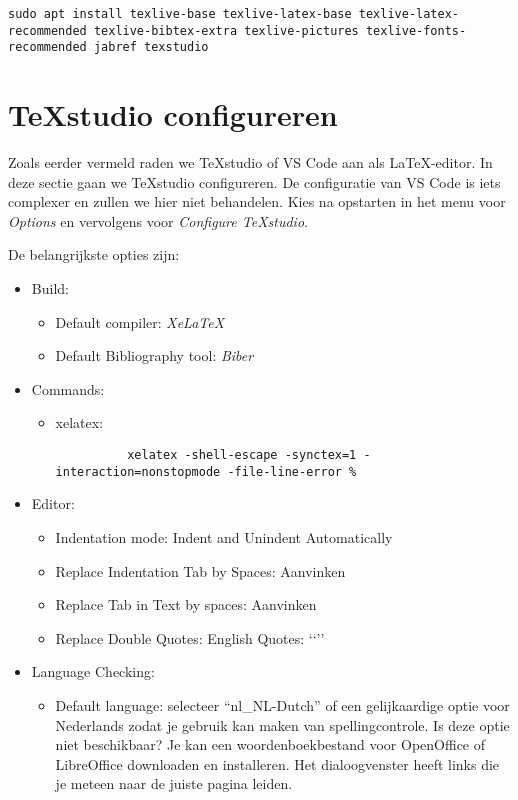 \begin{verbatim}
sudo apt install texlive-base texlive-latex-base texlive-latex-recommended texlive-bibtex-extra texlive-pictures texlive-fonts-recommended jabref texstudio
\end{verbatim}


\section{{\TeX}studio configureren}%
\label{sec:texstudio-configureren}

Zoals eerder vermeld raden we {\TeX}studio of VS Code aan als {\LaTeX}-editor. In deze sectie gaan we {\TeX}studio configureren. De configuratie van VS Code is iets complexer en zullen we hier niet behandelen. Kies na opstarten in het menu voor \textit{Options} en vervolgens voor \textit{Configure {\TeX}studio}.

De belangrijkste opties zijn:

\begin{itemize}
  \item Build:
    \begin{itemize}
      \item Default compiler: \textit{XeLaTeX}
      \item Default Bibliography tool: \textit{Biber}
    \end{itemize}
  \item Commands:
    \begin{itemize}
      \item xelatex:
      
        \begin{verbatim}
          xelatex -shell-escape -synctex=1 -interaction=nonstopmode -file-line-error %
        \end{verbatim}

    \end{itemize}
  \item Editor:
    \begin{itemize}
      \item Indentation mode: Indent and Unindent Automatically
      \item Replace Indentation Tab by Spaces: Aanvinken
      \item Replace Tab in Text by spaces: Aanvinken
      \item Replace Double Quotes: English Quotes: ‘‘’’
    \end{itemize}
  \item Language Checking:
    \begin{itemize}
      \item Default language: selecteer ``nl\_NL-Dutch'' of een gelijkaardige optie voor Nederlands zodat je gebruik kan maken van spellingcontrole. Is deze optie niet beschikbaar? Je kan een woordenboekbestand voor OpenOffice of LibreOffice downloaden en installeren. Het dialoogvenster heeft links die je meteen naar de juiste pagina leiden.
    \end{itemize}
\end{itemize}

